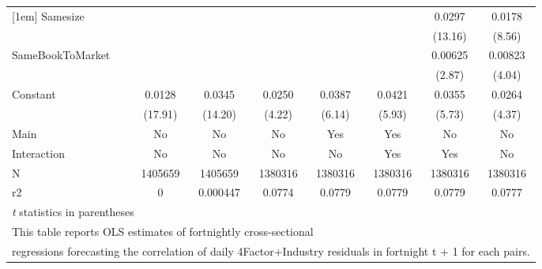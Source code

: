 {\begin{tabular}{l*{7}{c}}
[1em]
Samesize            &                     &                     &                     &                     &                     &      0.0297\sym{***}&      0.0178\sym{***}\\
                    &                     &                     &                     &                     &                     &     (13.16)         &      (8.56)         \\
[1em]
SameBookToMarket    &                     &                     &                     &                     &                     &     0.00625\sym{**} &     0.00823\sym{***}\\
                    &                     &                     &                     &                     &                     &      (2.87)         &      (4.04)         \\
[1em]
Constant            &      0.0128\sym{***}&      0.0345\sym{***}&      0.0250\sym{***}&      0.0387\sym{***}&      0.0421\sym{***}&      0.0355\sym{***}&      0.0264\sym{***}\\
                    &     (17.91)         &     (14.20)         &      (4.22)         &      (6.14)         &      (5.93)         &      (5.73)         &      (4.37)         \\
\hline
Main                &          No         &          No         &          No         &         Yes         &         Yes         &          No         &          No         \\
Interaction         &          No         &          No         &          No         &          No         &         Yes         &         Yes         &          No         \\
N                   &     1405659         &     1405659         &     1380316         &     1380316         &     1380316         &     1380316         &     1380316         \\
r2                  &           0         &    0.000447         &      0.0774         &      0.0779         &      0.0779         &      0.0779         &      0.0777         \\
\hline\hline
\multicolumn{8}{l}{\footnotesize \textit{t} statistics in parentheses}\\
\multicolumn{8}{l}{\footnotesize This table reports OLS estimates of fortnightly cross-sectional}\\
\multicolumn{8}{l}{\footnotesize  regressions forecasting the correlation of daily 4Factor+Industry residuals in fortnight t + 1 for each pairs.}\\

\end{tabular}}

